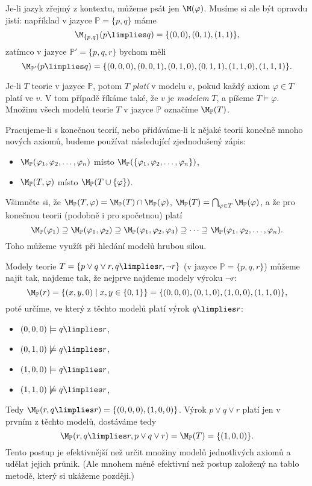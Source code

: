 Je-li jazyk zřejmý z kontextu, můžeme psát jen $\M(\varphi)$. Musíme si ale být opravdu jistí: například v jazyce $\mathbb P=\{p,q\}$ máme 
$$
\M_{\{p,q\}}(p\limplies q)=\{(0,0),(0,1),(1,1)\},$$
zatímco v jazyce $\mathbb P'=\{p,q,r\}$ bychom měli
$$
\M_{\mathbb P'}(p\limplies q)=\{(0,0,0),(0,0,1),(0,1,0),(0,1,1),(1,1,0),(1,1,1)\}.
$$


\begin{definition}\label{definition:validity-of-theory}
    Je-li $T$ teorie v jazyce  $\mathbb P$, potom $T$ \emph{platí} v modelu $v$, pokud každý axiom $\varphi\in T$ platí ve $v$. V tom případě říkáme také, že $v$ je \emph{modelem} $T$, a píšeme $T\models\varphi$. Množinu všech modelů teorie $T$ v jazyce $\mathbb P$ označíme $\M_\mathbb P(T)$.    
\end{definition}

Pracujeme-li s konečnou teorií, nebo přidáváme-li k nějaké teorii konečně mnoho nových axiomů, budeme používat následující zjednodušený zápis:
\begin{itemize}
    \item $\M_\mathbb P(\varphi_1,\varphi_2,\dots,\varphi_n)$ místo $\M_\mathbb P(\{\varphi_1,\varphi_2,\dots,\varphi_n\})$,
    \item $\M_\mathbb P(T,\varphi)$ místo $\M_\mathbb P(T\cup\{\varphi\})$.
\end{itemize}

Všimněte si, že $\M_\mathbb P(T,\varphi)=\M_\mathbb P(T)\cap\M_\mathbb P(\varphi)$, $\M_\mathbb P(T)=\bigcap_{\varphi\in T}\M_\mathbb P(\varphi)$, a že pro konečnou teorii (podobně i pro spočetnou) platí
$$
\M_\mathbb P(\varphi_1)\supseteq \M_\mathbb P(\varphi_1,\varphi_2)\supseteq \M_\mathbb P(\varphi_1,\varphi_2,\varphi_3)\supseteq\dots\supseteq\M_\mathbb P(\varphi_1,\varphi_2,\dots,\varphi_n).
$$
Toho můžeme využít při hledání modelů hrubou silou.

\begin{example}
    Modely teorie $T=\{p\lor q\lor r, q\limplies r, \neg r\}$ (v jazyce $\mathbb P=\{p,q,r\}$) můžeme najít tak, najdeme tak, že nejprve najdeme modely výroku $\neg r$:
    $$
    \M_\mathbb P(r)=\{(x,y,0)\mid x,y\in\{0,1\}\}=\{(0,0,0),(0,1,0),(1,0,0),(1,1,0)\},
    $$
    poté určíme, ve který z těchto modelů platí výrok $q\limplies r$: 
    \begin{itemize}
        \item $(0,0,0)\models q\limplies r$,
        \item $(0,1,0)\not\models q\limplies r$,
        \item $(1,0,0)\models q\limplies r$,
        \item $(1,1,0)\not\models q\limplies r$,
    \end{itemize}  
    Tedy $\M_\mathbb P(r,q\limplies r)=\{(0,0,0),(1,0,0)\}$. Výrok  $p\lor q\lor r$ platí jen v prvním z těchto modelů, dostáváme tedy
    $$
    \M_\mathbb P(r,q\limplies r,p\lor q\lor r)=\M_\mathbb P(T)=\{(1,0,0)\}.
    $$
    Tento postup je efektivnější než určit množiny modelů jednotlivých axiomů a udělat jejich průnik. (Ale mnohem méně efektivní než postup založený na tablo metodě, který si ukážeme později.)
\end{example}


